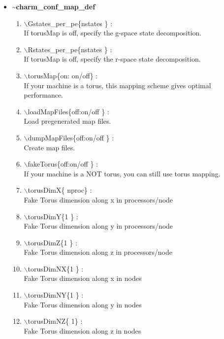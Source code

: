 \begin{itemize}
\clearpage
\huge
\item []{\bf \~{ }charm\_conf\_map\_def}
\begin{enumerate}
  \vspace{0.15in} \Large
  \item $\backslash$Gstates\_per\_pe\{nstates \} : \\    \large
  If torusMap is off, specify the g-space state decomposition.
  \vspace{0.15in} \Large
  \item $\backslash$Rstates\_per\_pe\{nstates \} : \\    \large
  If torusMap is off, specify the r-space state decomposition.
  \vspace{0.15in} \Large
  \item $\backslash$torusMap\{on: on/off\} : \\    \large
  If your machine is a torus, this mapping scheme gives optimal performance.
  \vspace{0.15in} \Large
  \item $\backslash$loadMapFiles\{off:on/off \} : \\    \large
  Load pregenerated map files.
  \vspace{0.15in} \Large
  \item $\backslash$dumpMapFiles\{off:on/off \} : \\    \large
  Create map files.
  \vspace{0.15in} \Large
  \item $\backslash$fakeTorus\{off:on/off \} : \\    \large
  If your machine is a NOT torus, you can still use torus mapping.
  \vspace{0.15in} \Large
  \item $\backslash$torusDimX\{ nproc\} : \\    \large
  Fake Torus dimension along x in processors/node
  \vspace{0.15in} \Large
  \item $\backslash$torusDimY\{1 \} : \\    \large
  Fake Torus dimension along y in processors/node
  \vspace{0.15in} \Large
  \item $\backslash$torusDimZ\{1 \} : \\    \large
  Fake Torus dimension along z in processors/node
  \vspace{0.15in} \Large
  \item $\backslash$torusDimNX\{1 \} : \\    \large
  Fake Torus dimension along x in nodes
  \vspace{0.15in} \Large
  \item $\backslash$torusDimNY\{1 \} : \\    \large
  Fake Torus dimension along y in nodes
  \vspace{0.15in} \Large
  \item $\backslash$torusDimNZ\{ 1\} : \\    \large
  Fake Torus dimension along z in nodes
\end{enumerate}


\end{itemize}
